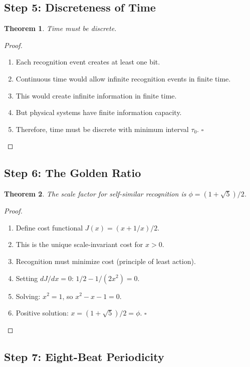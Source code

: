 \documentclass[12pt,a4paper]{article}
\newtheorem{theorem}{Theorem}
\begin{document}
\subsection{Step 5: Discreteness of Time}

\begin{theorem}
Time must be discrete.
\end{theorem}

\begin{proof}
\begin{enumerate}
\item Each recognition event creates at least one bit.
\item Continuous time would allow infinite recognition events in finite time.
\item This would create infinite information in finite time.
\item But physical systems have finite information capacity.
\item Therefore, time must be discrete with minimum interval $\tau_0$. $\square$
\end{enumerate}
\end{proof}

\subsection{Step 6: The Golden Ratio}

\begin{theorem}
The scale factor for self-similar recognition is $\phi = (1+\sqrt{5})/2$.
\end{theorem}

\begin{proof}
\begin{enumerate}
\item Define cost functional $J(x) = (x + 1/x)/2$.
\item This is the unique scale-invariant cost for $x > 0$.
\item Recognition must minimize cost (principle of least action).
\item Setting $dJ/dx = 0$: $1/2 - 1/(2x^2) = 0$.
\item Solving: $x^2 = 1$, so $x^2 - x - 1 = 0$.
\item Positive solution: $x = (1+\sqrt{5})/2 = \phi$. $\square$
\end{enumerate}
\end{proof}

\subsection{Step 7: Eight-Beat Periodicity}
\end{document}
